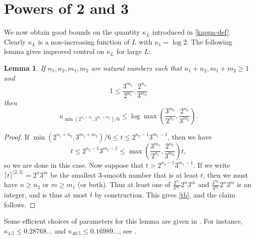 \documentclass[12pt,a4paper,reqno]{amsart}
\numberwithin{equation}{section}
\theoremstyle{plain}
\newtheorem{lemma}[theorem]{Lemma}
\theoremstyle{definition}
\begin{document}
\section{Powers of 2 and 3}\label{power-sec}

We now obtain good bounds on the quantity $\kappa_L$ introduced in \eqref{kappa-def}.  Clearly $\kappa_L$ is a non-increasing function of $L$ with $\kappa_1 = \log 2$.  The following lemma gives improved control on $\kappa_L$ for large $L$:

\begin{lemma}\label{lemcount-0}  If $n_1,n_2,m_1,m_2$ are natural numbers such that $n_1+n_2, m_1+m_2 \geq 1$ and
$$ 1 \leq \frac{3^{m_1}}{2^{n_1}}, \frac{2^{n_2}}{3^{m_2}}$$
then
$$ \kappa_{\min( 2^{n_1+n_2},3^{m_1+m_2})/6} \leq \log \max\left(\frac{3^{m_1}}{2^{n_1}}, \frac{2^{n_2}}{3^{m_2}}\right).$$
\end{lemma}

\begin{proof}  If $\min( 2^{n_1+n_2},3^{m_1+m_2})/6 \leq t \leq 2^{n_2-1} 3^{m_1-1}$, then we have
\begin{equation}\label{tb} 
  t \leq 2^{n_2-1} 3^{m_1-1} \leq \max\left(\frac{3^{m_1}}{2^{n_1}}, \frac{2^{n_2}}{3^{m_2}}\right) t,
\end{equation}
so we are done in this case.  Now suppose that $t > 2^{n_2-1} 3^{m_1-1}$.
If we write $\lceil t \rceil^{\langle 2,3 \rangle} =2^n 3^m$ be the smallest $3$-smooth number that is at least $t$, then we must have $n \geq n_2$ or $m \geq m_1$ (or both).  Thus at least one of $\frac{2^{n_1}}{3^{m_1}} 2^n 3^m$ and $\frac{3^{m_2}}{3^{n_2}} 2^n 3^m$ is an integer, and is thus at most $t$ by construction.  This gives \eqref{tb}, and the claim follows.
\end{proof}

Some efficient choices of parameters for this lemma are given in .  For instance, $\kappa_{4.5} \leq 0.28768\dots$ and $\kappa_{40.5} \leq 0.16989\dots$; see .
\end{document}
